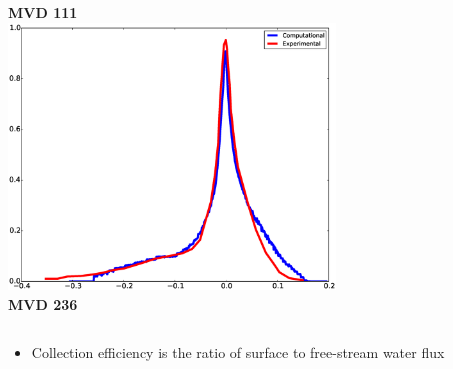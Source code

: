 \documentclass[9pt]{beamer}
\begin{document}
\begin{frame}
\begin{columns}[c]
    {\bf MVD 111} \\
    \includegraphics[width=0.65\textwidth]{MVD236} \\
    {\bf MVD 236}
\end{columns}

\begin{itemize}
\item Collection efficiency is the ratio of surface to free-stream water flux
\end{itemize}
\end{frame}
\end{document}
